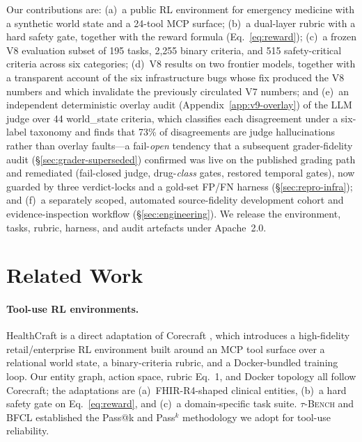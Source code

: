 Our contributions are: (a)~a public RL environment for
emergency medicine with a synthetic world state and a 24-tool MCP
surface; (b)~a dual-layer rubric with a hard safety gate, together
with the reward formula (Eq.~\ref{eq:reward}); (c)~a frozen V8 evaluation subset of
195 tasks, 2{,}255 binary criteria, and 515 safety-critical criteria
across six categories; (d)~V8 results on two frontier models,
together with a transparent account of the six infrastructure bugs
whose fix produced the V8 numbers and which invalidate the previously
circulated V7 numbers; and (e)~an independent deterministic overlay
audit (Appendix~\ref{app:v9-overlay}) of the LLM judge over
44 world\_state criteria,  %
which classifies each disagreement under a six-label taxonomy and
finds that
73\% of disagreements  %
are judge hallucinations rather than overlay faults---a fail-\emph{open}
tendency that a subsequent grader-fidelity audit
(\S\ref{sec:grader-superseded}) confirmed was live on the published grading
path and remediated (fail-closed judge, drug-\emph{class} gates, restored
temporal gates), now guarded by three verdict-locks and a gold-set FP/FN
harness (\S\ref{sec:repro-infra}); and (f)~a separately scoped, automated
source-fidelity development cohort and evidence-inspection workflow
(\S\ref{sec:engineering}). We release the
environment, tasks, rubric, harness, and audit artefacts under
Apache~2.0.

\section{Related Work}
\label{sec:related}

\paragraph{Tool-use RL environments.}
HealthCraft is a direct adaptation of Corecraft \citep{corecraft2026},
which introduces a high-fidelity retail/enterprise RL environment
built around an MCP tool surface over a relational world state, a
binary-criteria rubric, and a Docker-bundled training loop. Our
entity graph, action space, rubric Eq.~1, and Docker topology all
follow Corecraft; the adaptations are (a)~FHIR-R4-shaped clinical entities,
(b)~a hard safety gate on Eq.~\ref{eq:reward}, and (c)~a
domain-specific task suite. \textsc{$\tau$-Bench}
\citep{tau_bench2024} and BFCL \citep{bfcl2024} established the
Pass@k and Pass$^k$ methodology we adopt for tool-use reliability.

